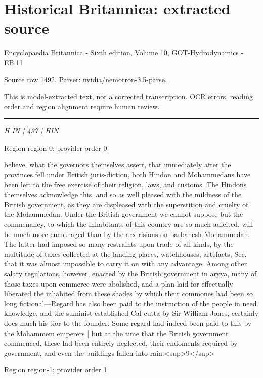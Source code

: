 \documentclass[11pt]{article}
\begin{document}
\section*{Historical Britannica: extracted source}
Encyclopaedia Britannica - Sixth edition, Volume 10, GOT-Hydrodynamics - EB.11\par
{\small Source row 1492. Parser: nvidia/nemotron-3.5-parse.\par}
{\small This is model-extracted text, not a corrected transcription. OCR errors, reading order and region alignment require human review.\par}
\hrule\medskip
{\small\itshape H IN [ 497 ] HIN\par}

{\scriptsize\color{gray} Region region-0; provider order 0.\par}
\medskip

believe, what the governors themselves assert, that immediately after the provinces fell under British juris-diction, both Hindon and Mohammedans have been left to the free exercise of their religion, laws, and customs. The Hindons themselves acknowledge this, and so as well pleased with the mildness of the British government, as they are displeased with the superstition and cruelty of the Mohammedan. Under the British government we cannot suppose but the commenancy, to which the inhabitants of this country are so much adicited, will be much more encouraged than by the arx-risions on barbanesh Mohammedan. The latter had imposed so many restraints upon trade of all kinds, by the multitude of taxes collected at the landing places, watchhouses, artefacts, Sec. that it was almost impossible to carry it on with any advantage. Among other salary regulations, however, enacted by the British government in aryya, many of those taxes upon commerce were abolished, and a plan laid for effectually liberated the inhabited from these shades by which their commones had been so long fictional—Regard has also been paid to the instruction of the people in need knowledge, and the suminist established Cal-cutta by Sir William Jones, certainly does much his tior to the founder. Some regard had indeed been paid to this by the Mohammem emperers | but at the time that the British government commenced, these Iad-been entirely neglected, their endoments required by government, and even the buildings fallen into rain.<sup>9</sup>
\par

{\scriptsize\color{gray} Region region-1; provider order 1.\par}
\medskip
\end{document}
